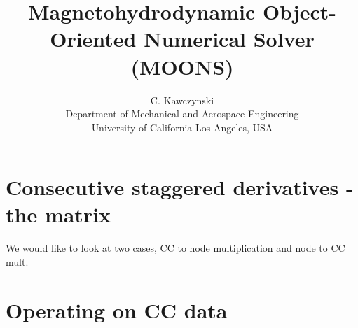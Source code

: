 \documentclass[landscape]{article}
\begin{document}
\doublespacing
\title{Magnetohydrodynamic Object-Oriented Numerical Solver (MOONS)}
\author{C. Kawczynski \\
Department of Mechanical and Aerospace Engineering \\
University of California Los Angeles, USA\\
}

\section{Consecutive staggered derivatives - the matrix}

We would like to look at two cases, CC to node multiplication and node to CC mult.

\section{Operating on CC data}
\end{document}
